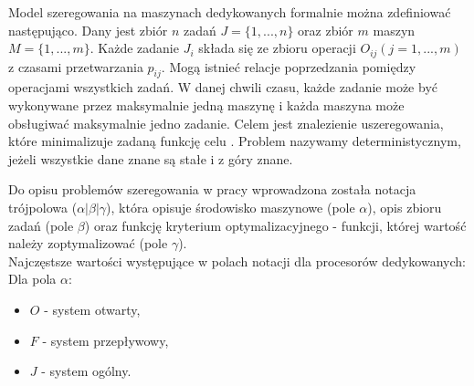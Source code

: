\documentclass[brudnopis]{xmgr}
\begin{document}
Model szeregowania na maszynach dedykowanych formalnie można zdefiniować następująco. Dany jest zbiór $n$ zadań $J=\{1, ..., n\}$ oraz zbiór $m$ maszyn $M=\{1, ..., m\}$.
Każde zadanie $J_i$ składa się ze zbioru operacji $O_{ij} (j=1, ..., m)$ z czasami przetwarzania $p_{ij}$.
Mogą istnieć relacje poprzedzania pomiędzy operacjami wszystkich zadań.
W danej chwili czasu, każde zadanie może być wykonywane przez maksymalnie jedną maszynę i każda maszyna może obsługiwać maksymalnie jedno zadanie.
Celem jest znalezienie uszeregowania, które minimalizuje zadaną funkcję celu \cite{brucker2007scheduling}. Problem nazywamy deterministycznym, jeżeli wszystkie dane znane są stałe i z góry znane.


Do opisu problemów szeregowania w pracy \cite{graham1979optimization} wprowadzona została notacja trójpolowa ($\alpha|\beta|\gamma$), która opisuje środowisko maszynowe (pole $\alpha$), opis zbioru zadań (pole $\beta$) oraz funkcję kryterium optymalizacyjnego - funkcji, której wartość należy zoptymalizować (pole $\gamma$).\\

Najczęstsze wartości występujące w polach notacji dla procesorów dedykowanych:\\

Dla pola $\alpha$:
\begin{itemize}
    \item $O$ - system otwarty,
    \item $F$ - system przepływowy,
    \item $J$ - system ogólny.
\end{itemize}
\end{document}
